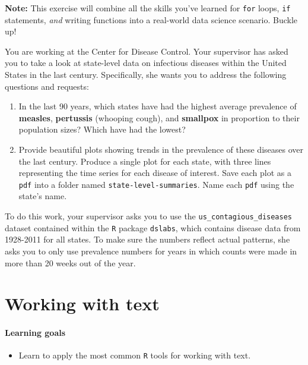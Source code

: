 \documentclass[
]{book}
\providecommand{\tightlist}{%
  \setlength{\itemsep}{0pt}\setlength{\parskip}{0pt}}
\begin{document}
\textbf{Note:} This exercise will combine all the skills you've learned for \texttt{for} loops, \texttt{if} statements, \emph{and} writing functions into a real-world data science scenario. Buckle up!

You are working at the Center for Disease Control. Your supervisor has asked you to take a look at state-level data on infectious diseases within the United States in the last century. Specifically, she wants you to address the following questions and requests:

\begin{enumerate}
\def\labelenumi{\arabic{enumi}.}
\item
  In the last 90 years, which states have had the highest average prevalence of \textbf{measles}, \textbf{pertussis} (whooping cough), and \textbf{smallpox} in proportion to their population sizes? Which have had the lowest?
\item
  Provide beautiful plots showing trends in the prevalence of these diseases over the last century. Produce a single plot for each state, with three lines representing the time series for each disease of interest. Save each plot as a \texttt{pdf} into a folder named \texttt{state-level-summaries}. Name each \texttt{pdf} using the state's name.
\end{enumerate}

To do this work, your supervisor asks you to use the \texttt{us\_contagious\_diseases} dataset contained within the \texttt{R} package \texttt{dslabs}, which contains disease data from 1928-2011 for all states. To make sure the numbers reflect actual patterns, she asks you to only use prevalence numbers for years in which counts were made in more than 20 weeks out of the year.

\hypertarget{text}{%
\chapter{Working with text}\label{text}}

\hypertarget{learning-goals-17}{%
\subsubsection*{Learning goals}\label{learning-goals-17}}

\begin{itemize}
\tightlist
\item
  Learn to apply the most common \texttt{R} tools for working with text.
\end{itemize}
\end{document}
